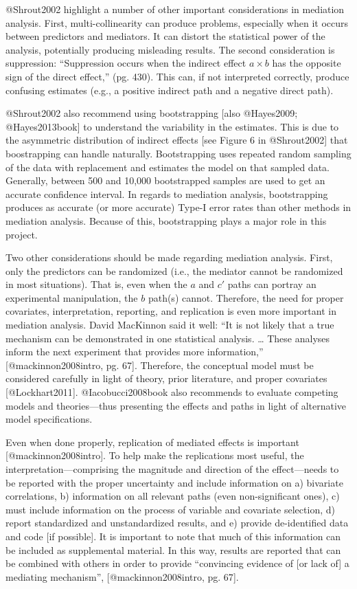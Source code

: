 \documentclass[]{article}
\begin{document}
@Shrout2002 highlight a number of other important considerations in
mediation analysis. First, multi-collinearity can produce problems,
especially when it occurs between predictors and mediators. It can
distort the statistical power of the analysis, potentially producing
misleading results. The second consideration is suppression:
``Suppression occurs when the indirect effect \(a \times b\) has the
opposite sign of the direct effect,'' (pg. 430). This can, if not
interpreted correctly, produce confusing estimates (e.g., a positive
indirect path and a negative direct path).

@Shrout2002 also recommend using bootstrapping {[}also @Hayes2009;
@Hayes2013book{]} to understand the variability in the estimates. This
is due to the asymmetric distribution of indirect effects {[}see Figure
6 in @Shrout2002{]} that boostrapping can handle naturally.
Bootstrapping uses repeated random sampling of the data with replacement
and estimates the model on that sampled data. Generally, between 500 and
10,000 bootstrapped samples are used to get an accurate confidence
interval. In regards to mediation analysis, bootstrapping produces as
accurate (or more accurate) Type-I error rates than other methods in
mediation analysis. Because of this, bootstrapping plays a major role in
this project.

Two other considerations should be made regarding mediation analysis.
First, only the predictors can be randomized (i.e., the mediator cannot
be randomized in most situations). That is, even when the \(a\) and
\(c'\) paths can portray an experimental manipulation, the \(b\) path(s)
cannot. Therefore, the need for proper covariates, interpretation,
reporting, and replication is even more important in mediation analysis.
David MacKinnon said it well: ``It is not likely that a true mechanism
can be demonstrated in one statistical analysis. \ldots{} These analyses
inform the next experiment that provides more information,''
{[}@mackinnon2008intro, pg. 67{]}. Therefore, the conceptual model must
be considered carefully in light of theory, prior literature, and proper
covariates {[}@Lockhart2011{]}. @Iacobucci2008book also recommends to
evaluate competing models and theories---thus presenting the effects and
paths in light of alternative model specifications.

Even when done properly, replication of mediated effects is important
{[}@mackinnon2008intro{]}. To help make the replications most useful,
the interpretation---comprising the magnitude and direction of the
effect---needs to be reported with the proper uncertainty and include
information on a) bivariate correlations, b) information on all relevant
paths (even non-significant ones), c) must include information on the
process of variable and covariate selection, d) report standardized and
unstandardized results, and e) provide de-identified data and code {[}if
possible{]}. It is important to note that much of this information can
be included as supplemental material. In this way, results are reported
that can be combined with others in order to provide ``convincing
evidence of {[}or lack of{]} a mediating mechanism'',
{[}@mackinnon2008intro, pg. 67{]}.
\end{document}
